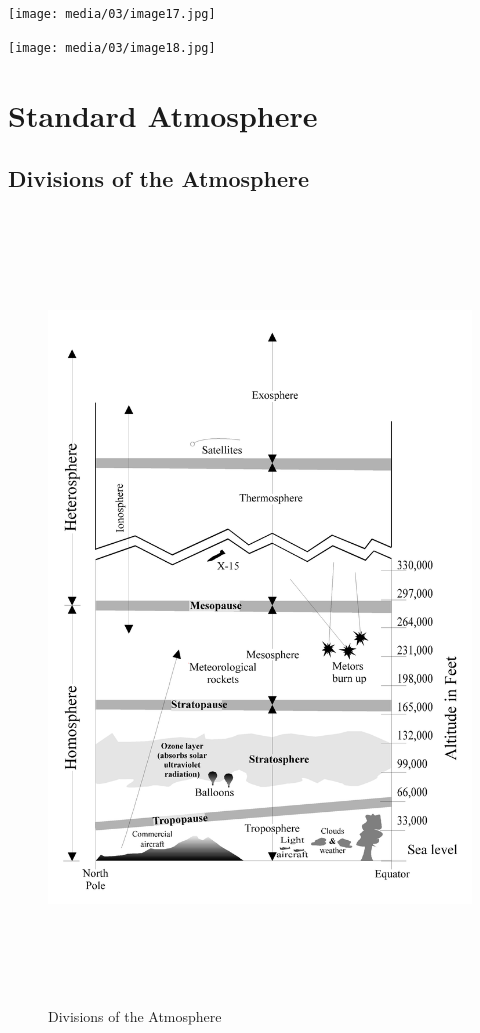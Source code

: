\documentclass[
]{book}
\begin{document}
\texttt{[image: media/03/image17.jpg]}

\texttt{[image: media/03/image18.jpg]}

\hypertarget{standard-atmosphere}{%
\section{Standard Atmosphere}\label{standard-atmosphere}}

\hypertarget{divisions-of-the-atmosphere}{%
\subsection*{Divisions of the Atmosphere}\label{divisions-of-the-atmosphere}}

\begin{figure}
\centering
\includegraphics[width=7in,height=8.25in]{media/03/image19.svg}
\caption{Divisions of the Atmosphere}
\end{figure}
\end{document}
